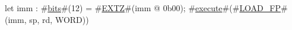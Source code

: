 let imm : #\hyperref[sailRISCVzbits]{bits}#(12) = #\hyperref[sailRISCVzEXTZ]{EXTZ}#(imm @ 0b00);
#\hyperref[sailRISCVzexecute]{execute}#(#\hyperref[sailRISCVzLOADzyFP]{LOAD\_FP}#(imm, sp, rd, WORD))

